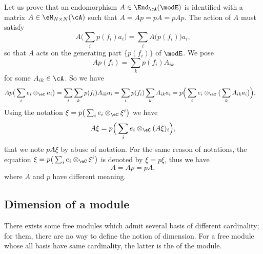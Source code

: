 Let us prove that an endomorphism $A\in\End_{\cA}(\modE)$ is identified with a matrix $A\in\eM_{N\times N}(\cA)$ such that $A=Ap=pA=pAp$. The action of $A$ must satisfy
\[
	A\big( \sum_ip(f_i)a_i \big)=\sum_iA\big( p(f_i) \big)a_i,
\]
so that $A$ acts on the generating part $\{ p(f_i) \}$ of $\modE$. We pose
\begin{equation}
	Ap(f_i)=\sum_kp(f_i)A_{ik}
\end{equation}
for some $A_{ik}\in\cA$. So we have
\begin{align*}
	Ap\big( \sum_ie_i\otimes_{\eC}a_i \big) & =\sum_i\sum_kp(f_i)A_{ik}a_i
	=\sum_ip(f_i)\sum_kA_{ik}a_i
	=p\Big( \sum_ie_i\otimes_{\eC}\big( \sum_kA_{ik}a_i \big) \Big).
\end{align*}
Using the notation $\xi=p\big( \sum_ie_i\otimes_{\eC}\xi^i \big)$ we have
\begin{equation}
	A\xi=p\Big( \sum_ie_i\otimes_{\eC}(A\xi)_i \Big),
\end{equation}
that we note $pA\xi$ by abuse of notation. For the same reason of notations, the equation $\xi=p\big( \sum_ie_i\otimes_{\eC}\xi^i \big)$ is denoted by $\xi=p\xi$, thus we have
\[
	A=Ap=pA,
\]
where $A$ and $p$ have different meaning.


\subsection{Dimension of a module} \label{subsec_DimofModule}

There exists some free modules which admit several basis of different cardinality; for them, there are no way to define the notion of dimension. For a free module whose all basis have same cardinality, the latter is the  of the module.

